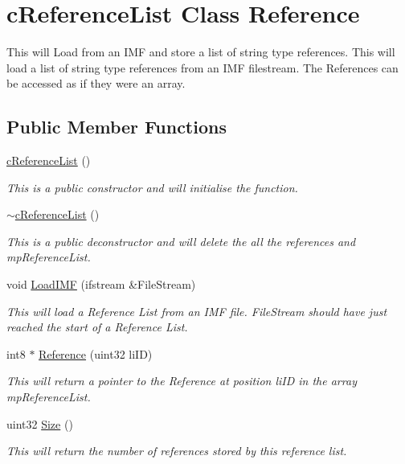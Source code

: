 \hypertarget{classc_reference_list}{
\section{cReferenceList Class Reference}
\label{classc_reference_list}
}


This will Load from an IMF and store a list of string type references. This will load a list of string type references from an IMF filestream. The References can be accessed as if they were an array.  


\subsection*{Public Member Functions}
\begin{DoxyCompactItemize}
\item 
\hyperlink{classc_reference_list_ab32c457ba5f81df31104e72401f971d0}{cReferenceList} ()
\begin{DoxyCompactList}\small\item\em This is a public constructor and will initialise the function. \item\end{DoxyCompactList}\item 
\hyperlink{classc_reference_list_a80fa096249122d31be380c795ed04f23}{$\sim$cReferenceList} ()
\begin{DoxyCompactList}\small\item\em This is a public deconstructor and will delete the all the references and mpReferenceList. \item\end{DoxyCompactList}\item 
void \hyperlink{classc_reference_list_a7ef296a2936e85cc648c52401662d38d}{LoadIMF} (ifstream \&FileStream)
\begin{DoxyCompactList}\small\item\em This will load a Reference List from an IMF file. FileStream should have just reached the start of a Reference List. \item\end{DoxyCompactList}\item 
int8 $\ast$ \hyperlink{classc_reference_list_a95482f62d9b0ccf0a521c56f2930b1b8}{Reference} (uint32 liID)
\begin{DoxyCompactList}\small\item\em This will return a pointer to the Reference at position liID in the array mpReferenceList. \item\end{DoxyCompactList}\item 
uint32 \hyperlink{classc_reference_list_a62594e7b164aa1f430a928cd9af655e3}{Size} ()
\begin{DoxyCompactList}\small\item\em This will return the number of references stored by this reference list. \item\end{DoxyCompactList}\end{DoxyCompactItemize}


